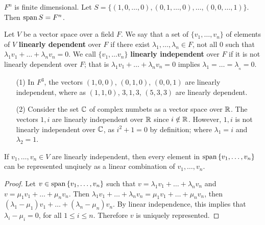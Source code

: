 \begin{example}
    $F^n$ is finite dimensional. Let
    $S=\{(1,0,\dots,0),(0,1,\dots,0),\dots,(0,0,\dots,1)\}$. Then
    $\operatorname{span}{S}=F^n$.
\end{example} 

\begin{definition}
    Let $V$ be a vector space over a field $F$. We say that a set of $\{v_1, \dots, v_n\}$ of
    elements of $V$  \textbf{linearly dependent} over $F$ if there exist
    $\lambda_1,\dots, \lambda_n \in F$, not all $0$ such that
    $\lambda_1v_1+\dots+\lambda_nv_n=0$. We call $\{v_1, \dots v_n\}$
    \textbf{linearly independent} over $F$ if it is not linearly dependent over
    $F$; that is  $\lambda_1v_1+\dots+\lambda_nv_n=0$ implies $\lambda_1= \dots
    =\lambda__n=0$.
\end{definition}

\begin{example}
    \begin{enumerate}
        \item[(1)] In $F^3$, the vectors  $(1,0,0)$, $(0,1,0)$, $(0,0,1)$ are linearly
        independent, where as $(1,1,0)$, $3,1,3$,  $(5,3,3)$ are linearly dependent.

    \item[(2)] Consider the set $\mathbb{C}$ of  complex numbets as a vector space over
        $\mathbb{R}$. The vectors  $1,i$ are linearly independent over  $\mathbb{R}$ since  $i
        \notin \mathbb{R}$. However,  $1,i$ is not linearly independent over  $\mathbb{C}$, as
        $i^2+1=0$ by definition; where  $\lambda_1=i$ and $\lambda_2=1$.
    \end{enumerate}
\end{example}

\begin{lemma}\label{2.2.3}
    If $v_1, \dots, v_n \in V$ are linearly independent, then every element in
    $\operatorname{span}{\{v_1, \dots, v_n\}}$ can be represented unqiuely as a linear
    combination of $ v_1, \dots, v_n$.
\end{lemma}
\begin{proof}
    Let $v \in \operatorname{span}{\{v_1, \dots, v_n\}}$ such that
    $v=\lambda_1v_1+\dots+\lambda_nv_n$ and $v=\mu_1v_1+\dots+\mu_nv_n$. Then
    $\lambda_1v_1+\dots+\lambda_nv_n=\mu_1v_1+\dots+\mu_nv_n$, then
    $(\lambda_1-\mu_1)v_1+\dots+(\lambda_n-\mu_n)v_n$. By linear independence,
    this implies that $\lambda_i-\mu_i=0$, for all  $1 \leq i \leq n$. Therefore
     $v$ is uniquely represented.
\end{proof}

